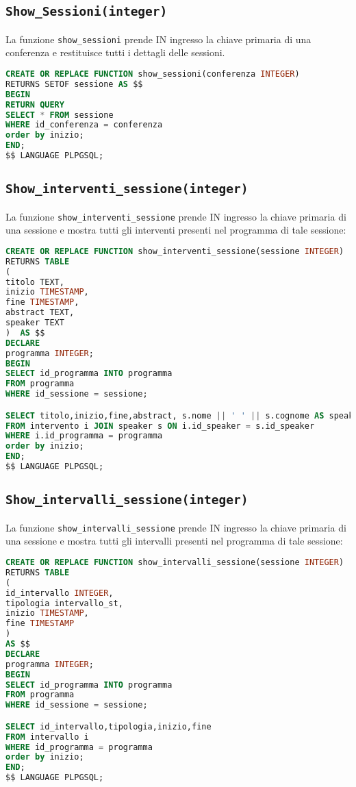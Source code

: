 \subsection{\texttt{Show\_Sessioni(integer)}}
La funzione \texttt{show\_sessioni} prende IN ingresso la chiave primaria di una conferenza e restituisce tutti i dettagli delle sessioni.
\begin{lstlisting}[language=SQL, style=mystyle]
CREATE OR REPLACE FUNCTION show_sessioni(conferenza INTEGER)
RETURNS SETOF sessione AS $$
BEGIN
RETURN QUERY
SELECT * FROM sessione
WHERE id_conferenza = conferenza
order by inizio;
END;
$$ LANGUAGE PLPGSQL;
\end{lstlisting}
\subsection{\texttt{Show\_interventi\_sessione(integer)}}
La funzione \texttt{show\_interventi\_sessione} prende IN ingresso la chiave primaria di una sessione e mostra tutti gli interventi presenti nel programma di tale sessione:
\begin{lstlisting}[language=SQL,style=mystyle]
CREATE OR REPLACE FUNCTION show_interventi_sessione(sessione INTEGER)
RETURNS TABLE
(
titolo TEXT,
inizio TIMESTAMP,
fine TIMESTAMP,
abstract TEXT,
speaker TEXT
)  AS $$
DECLARE 
programma INTEGER;
BEGIN
SELECT id_programma INTO programma
FROM programma
WHERE id_sessione = sessione;

SELECT titolo,inizio,fine,abstract, s.nome || ' ' || s.cognome AS speaker
FROM intervento i JOIN speaker s ON i.id_speaker = s.id_speaker
WHERE i.id_programma = programma
order by inizio;
END;
$$ LANGUAGE PLPGSQL;
\end{lstlisting}

\subsection{\texttt{Show\_intervalli\_sessione(integer)}}
La funzione \texttt{show\_intervalli\_sessione} prende IN ingresso la chiave primaria di una sessione e mostra tutti gli intervalli presenti nel programma di tale sessione:
\begin{lstlisting}[language=SQL,style=mystyle]
CREATE OR REPLACE FUNCTION show_intervalli_sessione(sessione INTEGER)
RETURNS TABLE
(
id_intervallo INTEGER,
tipologia intervallo_st,
inizio TIMESTAMP,
fine TIMESTAMP
)  
AS $$
DECLARE 
programma INTEGER;
BEGIN
SELECT id_programma INTO programma
FROM programma
WHERE id_sessione = sessione;

SELECT id_intervallo,tipologia,inizio,fine
FROM intervallo i
WHERE id_programma = programma
order by inizio;
END;
$$ LANGUAGE PLPGSQL;
\end{lstlisting}
